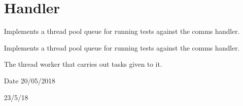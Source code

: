 \hypertarget{group__Thread}{}\section{Handler}
\label{group__Thread}


Implements a thread pool queue for running tests against the comms handler.  


Implements a thread pool queue for running tests against the comms handler. 

The thread worker that carries out tasks given to it.

\begin{DoxyDate}{Date}
20/05/2018

23/5/18 
\end{DoxyDate}
